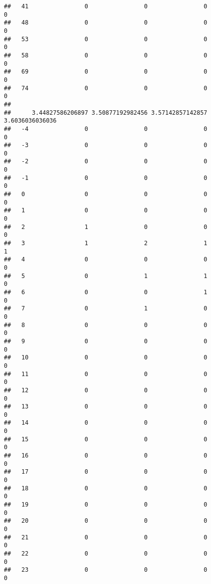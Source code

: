 \documentclass[]{article}
\begin{document}
\begin{verbatim}
##   41                0                0                0                0
##   48                0                0                0                0
##   53                0                0                0                0
##   58                0                0                0                0
##   69                0                0                0                0
##   74                0                0                0                0
##     
##      3.44827586206897 3.50877192982456 3.57142857142857 3.6036036036036
##   -4                0                0                0               0
##   -3                0                0                0               0
##   -2                0                0                0               0
##   -1                0                0                0               0
##   0                 0                0                0               0
##   1                 0                0                0               0
##   2                 1                0                0               0
##   3                 1                2                1               1
##   4                 0                0                0               0
##   5                 0                1                1               0
##   6                 0                0                1               0
##   7                 0                1                0               0
##   8                 0                0                0               0
##   9                 0                0                0               0
##   10                0                0                0               0
##   11                0                0                0               0
##   12                0                0                0               0
##   13                0                0                0               0
##   14                0                0                0               0
##   15                0                0                0               0
##   16                0                0                0               0
##   17                0                0                0               0
##   18                0                0                0               0
##   19                0                0                0               0
##   20                0                0                0               0
##   21                0                0                0               0
##   22                0                0                0               0
##   23                0                0                0               0

\end{verbatim}
\end{document}
